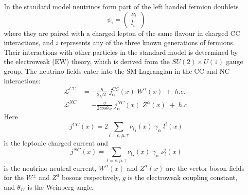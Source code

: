 In the standard model neutrinos form part of the left handed fermion doublets
\begin{equation}
	\psi_i = \begin{pmatrix} \nu_i \\ l^-_i \end{pmatrix}
\end{equation}
where they are paired with a charged lepton of the same flavour in charged
CC interactions, and $i$ represents any of the three known generations of 
fermions. Their interactions with other particles in the standard model is
determined by the electroweak (EW) theory, which is derived from the $SU(2)
\times U(1)$ gauge group. The neutrino fields enter into the SM Lagrangian in
the CC and NC interactions:
\begin{align}
	\label{eqn:cc_lag}
	\mathcal{L}^{CC} &= -\frac{g}{2\sqrt{2}}\; j^{CC}_\alpha(x)\; W^\alpha(x)\; +\; h.c. \\
	\mathcal{L}^{NC} &= -\frac{g}{2cos\theta_W}\; j^{NC}_\alpha(x)\; Z^\alpha(x)\; +\; h.c.
\end{align}
Here 
\begin{equation}
	\label{eqn:cc_curr}
	j^{CC}(x) = 2 \sum_{l=e,\mu,\tau} \bar{\nu_l}_{i}(x)\; \gamma_\alpha\; l^i(x)
\end{equation}
is the leptonic charged current and
\begin{equation}
	j^{NC}(x) = \sum_{l=e,\mu,\tau} \bar{\nu_l}_i(x)\; \gamma_\alpha\; \nu_l^i(x)
\end{equation}
is the neutrino neutral current, $W^\alpha(x)$ and $Z^\alpha(x)$ are the vector
boson fields for the $W^\pm$ and $Z^0$ bosons respectively, $g$ is the 
electroweak coupling constant, and $\theta_W$ is the Weinberg angle.

